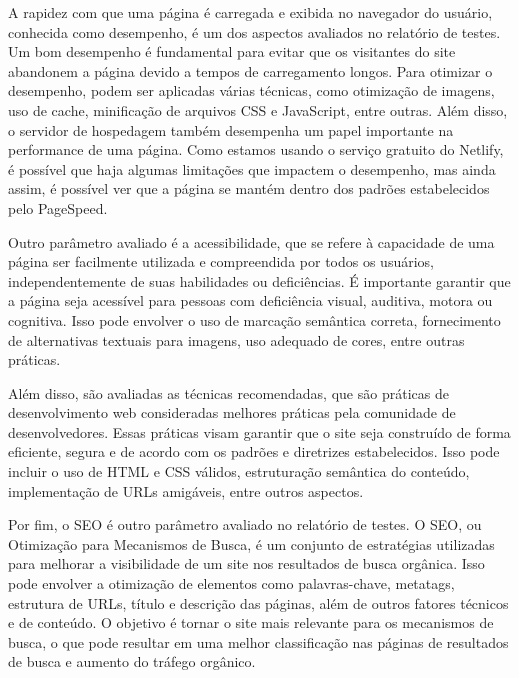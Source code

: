 \documentclass[tcc,capa]{texufpel}
\begin{document}
A rapidez com que uma página é carregada e exibida no navegador do usuário, conhecida como desempenho, é um dos aspectos avaliados no relatório de testes. Um bom desempenho é fundamental para evitar que os visitantes do site abandonem a página devido a tempos de carregamento longos. Para otimizar o desempenho, podem ser aplicadas várias técnicas, como otimização de imagens, uso de cache, minificação de arquivos CSS e JavaScript, entre outras. Além disso, o servidor de hospedagem também desempenha um papel importante na performance de uma página. Como estamos usando o serviço gratuito do Netlify, é possível que haja algumas limitações que impactem o desempenho, mas ainda assim, é possível ver que a página se mantém dentro dos padrões estabelecidos pelo PageSpeed.

Outro parâmetro avaliado é a acessibilidade, que se refere à capacidade de uma página ser facilmente utilizada e compreendida por todos os usuários, independentemente de suas habilidades ou deficiências. É importante garantir que a página seja acessível para pessoas com deficiência visual, auditiva, motora ou cognitiva. Isso pode envolver o uso de marcação semântica correta, fornecimento de alternativas textuais para imagens, uso adequado de cores, entre outras práticas.

Além disso, são avaliadas as técnicas recomendadas, que são práticas de desenvolvimento web consideradas melhores práticas pela comunidade de desenvolvedores. Essas práticas visam garantir que o site seja construído de forma eficiente, segura e de acordo com os padrões e diretrizes estabelecidos. Isso pode incluir o uso de HTML e CSS válidos, estruturação semântica do conteúdo, implementação de URLs amigáveis, entre outros aspectos.

Por fim, o SEO é outro parâmetro avaliado no relatório de testes. O SEO, ou Otimização para Mecanismos de Busca, é um conjunto de estratégias utilizadas para melhorar a visibilidade de um site nos resultados de busca orgânica. Isso pode envolver a otimização de elementos como palavras-chave, metatags, estrutura de URLs, título e descrição das páginas, além de outros fatores técnicos e de conteúdo. O objetivo é tornar o site mais relevante para os mecanismos de busca, o que pode resultar em uma melhor classificação nas páginas de resultados de busca e aumento do tráfego orgânico.
\end{document}
